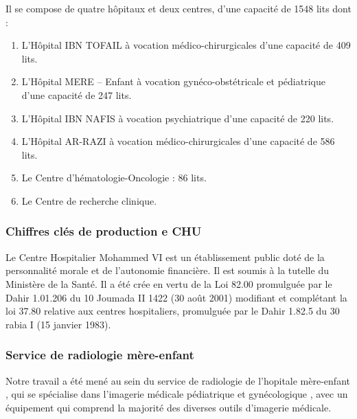             Il se compose de quatre hôpitaux et deux centres, d’une capacité de 1548 lits dont :
            \begin{enumerate}
                    \item L’Hôpital IBN TOFAIL à vocation médico-chirurgicales d’une capacité de 409 lits.
                    \item L’Hôpital MERE – Enfant à vocation gynéco-obstétricale et pédiatrique d’une capacité de 247 lits.
                    \item L’Hôpital IBN NAFIS à vocation psychiatrique d’une capacité de 220 lits.
                    \item L’Hôpital AR-RAZI à vocation médico-chirurgicales d’une capacité de 586 lits.
                    \item Le Centre d'hématologie-Oncologie : 86 lits.
                    \item Le Centre de recherche clinique.
            \end{enumerate}

            \subsubsection{Chiffres clés de production e CHU}
            Le Centre Hospitalier Mohammed VI est un établissement public doté de la personnalité morale et de l’autonomie financière. Il est soumis à la tutelle du Ministère de la Santé. Il a été crée en vertu de la Loi 82.00 promulguée par le Dahir 1.01.206 du 10 Joumada II 1422 (30 août 2001) modifiant et complétant la loi 37.80 relative aux centres hospitaliers, promulguée par le Dahir 1.82.5 du 30 rabia I (15 janvier 1983).

        
            \subsubsection{Service de radiologie mère-enfant}\label{service_radio}
            Notre travail a été mené au sein du service de radiologie de l’hopitale mère-enfant , qui se spécialise dans l’imagerie médicale pédiatrique et gynécologique , avec un équipement qui comprend la majorité des diverses outils d’imagerie médicale.
            
